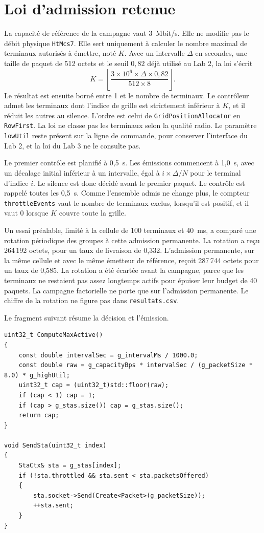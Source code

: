 \documentclass[11pt,a4paper]{article}
\begin{document}
\section{Loi d'admission retenue}

La capacité de référence de la campagne vaut 3~Mbit/s. Elle ne modifie pas le débit physique \texttt{HtMcs7}. Elle sert uniquement à calculer le nombre maximal de terminaux autorisés à émettre, noté $K$. Avec un intervalle $\Delta$ en secondes, une taille de paquet de 512 octets et le seuil $0{,}82$ déjà utilisé au Lab 2, la loi s'écrit
\[
  K = \left\lfloor \frac{3\times 10^{6}\times \Delta \times 0{,}82}{512 \times 8} \right\rfloor.
\]
Le résultat est ensuite borné entre 1 et le nombre de terminaux. Le contrôleur admet les terminaux dont l'indice de grille est strictement inférieur à $K$, et il réduit les autres au silence. L'ordre est celui de \texttt{GridPositionAllocator} en \texttt{RowFirst}. La loi ne classe pas les terminaux selon la qualité radio. Le paramètre \texttt{lowUtil} reste présent sur la ligne de commande, pour conserver l'interface du Lab 2, et la loi du Lab 3 ne le consulte pas.

Le premier contrôle est planifié à 0,5~s. Les émissions commencent à 1,0~s, avec un décalage initial inférieur à un intervalle, égal à $i \times \Delta / N$ pour le terminal d'indice $i$. Le silence est donc décidé avant le premier paquet. Le contrôle est rappelé toutes les 0,5~s. Comme l'ensemble admis ne change plus, le compteur \texttt{throttleEvents} vaut le nombre de terminaux exclus, lorsqu'il est positif, et il vaut 0 lorsque $K$ couvre toute la grille.

Un essai préalable, limité à la cellule de 100 terminaux et 40~ms, a comparé une rotation périodique des groupes à cette admission permanente. La rotation a reçu 264\,192 octets, pour un taux de livraison de 0,332. L'admission permanente, sur la même cellule et avec le même émetteur de référence, reçoit 287\,744 octets pour un taux de 0,585. La rotation a été écartée avant la campagne, parce que les terminaux ne restaient pas assez longtemps actifs pour épuiser leur budget de 40 paquets. La campagne factorielle ne porte que sur l'admission permanente. Le chiffre de la rotation ne figure pas dans \texttt{resultats.csv}.

Le fragment suivant résume la décision et l'émission.

\begin{lstlisting}
uint32_t ComputeMaxActive()
{
    const double intervalSec = g_intervalMs / 1000.0;
    const double raw = g_capacityBps * intervalSec / (g_packetSize * 8.0) * g_highUtil;
    uint32_t cap = (uint32_t)std::floor(raw);
    if (cap < 1) cap = 1;
    if (cap > g_stas.size()) cap = g_stas.size();
    return cap;
}

void SendSta(uint32_t index)
{
    StaCtx& sta = g_stas[index];
    if (!sta.throttled && sta.sent < sta.packetsOffered)
    {
        sta.socket->Send(Create<Packet>(g_packetSize));
        ++sta.sent;
    }
}
\end{lstlisting}
\end{document}
